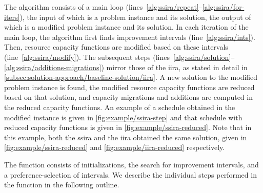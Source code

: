 The algorithm consists of a main loop (lines~\ref{alg:ssira/repeat}--\ref{alg:ssira/for-iters}),
the input of which is a problem instance and its solution,
the output of which is a modified problem instance and its solution.
In each iteration of the main loop, the algorithm first finds improvement intervals (line~\ref{alg:ssira/ints}).
Then, resource capacity functions are modified based on these intervals (line~\ref{alg:ssira/modify}).
The subsequent steps (lines~\ref{alg:ssira/solution}--\ref{alg:ssira/additions-migrations}) mirror those of the \ac{iira},
as stated in detail in \cref{subsec:solution-approach/baseline-solution/iira}.
A new solution to the modified problem instance is found,
the modified resource capacity functions are reduced based on that solution,
and capacity migrations and additions are computed in the reduced capacity functions.
An example of a schedule obtained in the modified instance is given in \cref{fig:example/ssira-step}
and that schedule with reduced capacity functions is given in \cref{fig:example/ssira-reduced}.
Note that in this example, both the \ac{ssira} and the \ac{iira} obtained the same solution,
given in \cref{fig:example/ssira-reduced} and \cref{fig:example/iira-reduced} respectively.

The  function consists of initializations,
the search for improvement intervals, and a preference-selection of intervals.
We describe the individual steps performed in the function in the following outline.

